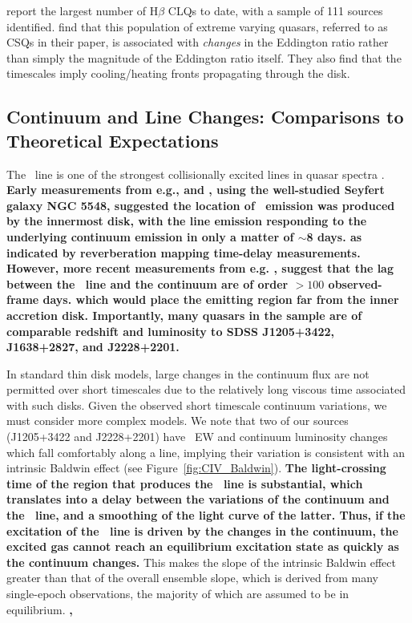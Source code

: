 \documentclass[fleqn,usenatbib]{mnras}
\begin{document}
\citet{Graham2020} report the largest number of H$\beta$ CLQs to
date, with a sample of 111 sources identified. \citet{Graham2020}
find that this population of extreme varying quasars, referred to as
CSQs in their paper, is associated with {\it changes} in the Eddington
ratio rather than simply the magnitude of the Eddington ratio itself.
They also find that the timescales imply cooling/heating fronts
propagating through the disk.


\subsection{Continuum and Line Changes: Comparisons to Theoretical Expectations}\label{sec:theory}
The \civ\ line is one of the strongest collisionally excited lines in
quasar spectra \citep[e.g.,][]{HamannFerland1999}.  {\bf Early
measurements from e.g., \citet{PoggePeterson1992} and
\citet{Peterson1997book}, using the well-studied Seyfert galaxy NGC
5548, suggested the location of \civ\ emission was produced by the
innermost disk, with the line emission responding to the underlying
continuum emission in only a matter of $\sim$8 days.  as indicated by
reverberation mapping time-delay measurements.  However, more recent
measurements from e.g. \citet[][and references therein]{Grier2019},
suggest that the lag between the \civ\ line and the continuum are of
order $>100$ observed-frame days.  which would place the \civ emitting
region far from the inner accretion disk.  Importantly, many quasars
in the \citet{Grier2019} sample are of comparable redshift and
luminosity to SDSS J1205+3422, J1638+2827, and J2228+2201.}

In standard \citet{SS73} thin disk models, large changes in the
continuum flux are not permitted over short timescales due to the
relatively long viscous time associated with such disks. Given the
observed short timescale continuum variations, we must consider more
complex models. We note that two of our sources (J1205+3422 and
J2228+2201) have \civ\ EW and continuum luminosity changes which fall
comfortably along a line, implying their variation is consistent with
an intrinsic Baldwin effect (see Figure~\ref{fig:CIV_Baldwin}).
{\bf The light-crossing time of the region that produces the \civ\ line is substantial,
which translates into a delay between the variations of the continuum and
the \civ\ line, and a smoothing of the light curve of the latter.
Thus, if the excitation of the \civ\ line is driven by the changes in the
continuum, the excited gas cannot reach an equilibrium
excitation state as quickly as the continuum changes.}
This makes the slope of the intrinsic Baldwin effect greater than that
of the overall ensemble slope, which is derived from many single-epoch
observations, the majority of which are assumed to be in equilibrium.
{\bf \citet{Grier2019}, }
\end{document}
